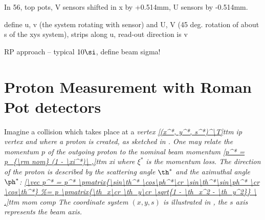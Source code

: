 

In 56, top pots, V sensors shifted in x by +0.514mm, U sensors by -0.514mm.

\> define u, v (the system rotating with sensor) and U, V (45 deg. rotation of about s of the xys system), strips along u, read-out direction is v

\> RP approach -- typical $10\si$, define beam sigma!


\iffalse
\bmfig
\fig[8cm]{fig/external/RP_stations_original.pdf}{s}{[7cm]RP stations}
\fig[6cm]{fig/external/rp_unit.jpg}{rp unit}{[7cm]RP unit}
\emfig

\bmfig
\fig[6cm]{fig/external/rp.jpg}{rp rp}{[7cm]A Roman Pot}
\fig[6cm]{fig/external/rp_package.jpg}{rp package}{[7cm]Detector package}
\emfig

\bmfig
\fig[6cm]{fig/external/hybrid2.jpg}{rp hybrid}{[7cm]A hybrid with a silicon detector and four VFAT chips.}
\fig[6cm]{fig/external/silicon_explained.png}{rp sensor}{[7cm]A detail of a silicon sensor.}
\emfig
\fi

\section[rp measurement]{Proton Measurement with Roman Pot detectors}



Imagine a collision which takes place at a \em{vertex}
\eqref{(x^*, y^*, s^*)^\T}{ttm ip vertex}
and where a proton is created, as sketched in . One may relate the momentum $p$ of the outgoing proton to the nominal beam momentum
\eqref{p^* = p_{\rm nom} (1 - \xi^*)\ ,}{ttm xi}
where $\xi^*$ is the \em{momentum loss}. The direction of the proton is described by the \em{scattering angle} $\th^*$ and the \em{azimuthal angle} $\ph^*$:
\eqref{\vec p^* = p^* \pmatrix{\sin\th^* \cos\ph^*\cr \sin\th^*\sin\ph^* \cr \cos\th^*}
\ .}{ttm mom comp}
The coordinate system $(x, y, s)$ is illustrated in , the $s$ axis represents the beam axis.

